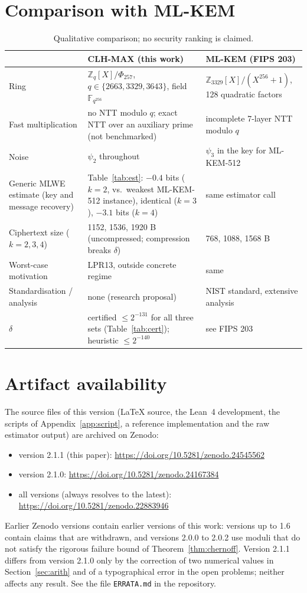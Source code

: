\documentclass[11pt]{article}
\theoremstyle{remark}
\newcommand{\Z}{\mathbb{Z}}
\newcommand{\F}{\mathbb{F}}
\begin{document}
\section{Comparison with ML-KEM}
\begin{table}[h]\centering\small
\begin{tabular}{p{3.4cm}p{5.8cm}p{5.2cm}}\toprule
 & CLH-MAX (this work) & ML-KEM (FIPS 203)\\\midrule
Ring & $\Z_q[X]/\Phi_{257}$, $q\in\{2663,3329,3643\}$, field $\F_{q^{256}}$ & $\Z_{3329}[X]/(X^{256}+1)$, 128 quadratic factors\\
Fast multiplication & no NTT modulo $q$; exact NTT over an auxiliary prime (not benchmarked) & incomplete 7-layer NTT modulo $q$\\
Noise & $\psi_2$ throughout & $\psi_3$ in the key for ML-KEM-512\\
Generic MLWE estimate (key and message recovery) & Table~\ref{tab:est}: $-0.4$ bits ($k=2$, vs.\ weakest ML-KEM-512 instance), identical ($k=3$), $-3.1$ bits ($k=4$) & same estimator call\\
Ciphertext size ($k=2,3,4$) & 1152, 1536, 1920 B (uncompressed; compression breaks $\delta$) & 768, 1088, 1568 B\\
Worst-case motivation & LPR13, outside concrete regime & same\\
Standardisation / analysis & none (research proposal) & NIST standard, extensive analysis\\
$\delta$ & certified $\le2^{-131}$ for all three sets (Table~\ref{tab:cert}); heuristic $\le2^{-140}$ & see FIPS 203\\\bottomrule
\end{tabular}
\caption{Qualitative comparison; no security ranking is claimed.}
\end{table}

\section{Artifact availability}\label{sec:artifact}
The source files of this version (\LaTeX{} source, the Lean~4 development, the scripts of Appendix~\ref{app:script}, a reference implementation and the raw estimator output) are archived on Zenodo:
\begin{itemize}[nosep]
\item version 2.1.1 (this paper): \url{https://doi.org/10.5281/zenodo.24545562} %
\item version 2.1.0: \url{https://doi.org/10.5281/zenodo.24167384}
\item all versions (always resolves to the latest): \url{https://doi.org/10.5281/zenodo.22883946}
\end{itemize}
Earlier Zenodo versions contain earlier versions of this work: versions up to 1.6 contain claims that are withdrawn, and versions 2.0.0 to 2.0.2 use moduli that do not satisfy the rigorous failure bound of Theorem~\ref{thm:chernoff}. Version 2.1.1 differs from version 2.1.0 only by the correction of two numerical values in Section~\ref{sec:arith} and of a typographical error in the open problems; neither affects any result. See the file \texttt{ERRATA.md} in the repository.
\end{document}
